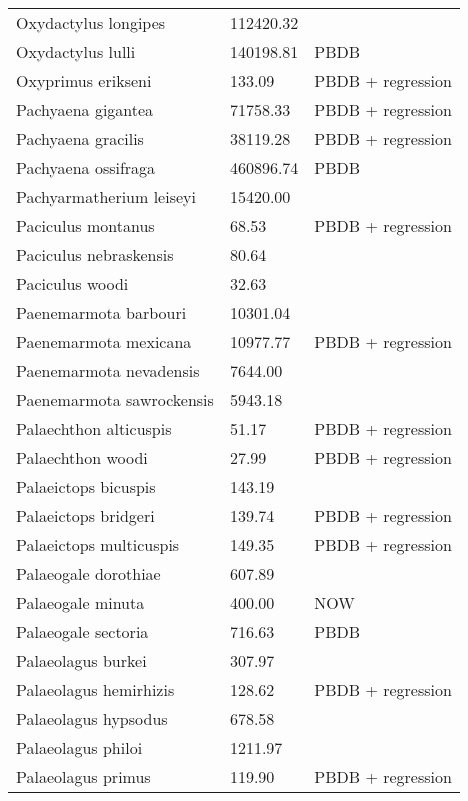 \documentclass{article}
\begin{document}
\begin{center}
\begin{longtable}{p{} p{} p{}}
    Oxydactylus longipes & 112420.32 & \cite{Tomiya2013} \\ 
    Oxydactylus lulli & 140198.81 & PBDB \\ 
    Oxyprimus erikseni & 133.09 & PBDB + regression \\ 
    Pachyaena gigantea & 71758.33 & PBDB + regression \\ 
    Pachyaena gracilis & 38119.28 & PBDB + regression \\ 
    Pachyaena ossifraga & 460896.74 & PBDB \\ 
    Pachyarmatherium leiseyi & 15420.00 & \cite{McDonald2005} \\ 
    Paciculus montanus & 68.53 & PBDB + regression \\ 
    Paciculus nebraskensis & 80.64 & \cite{Tomiya2013} \\ 
    Paciculus woodi & 32.63 & \cite{Korth1993} \\ 
    Paenemarmota barbouri & 10301.04 & \cite{Tomiya2013} \\ 
    Paenemarmota mexicana & 10977.77 & PBDB + regression \\ 
    Paenemarmota nevadensis & 7644.00 & \cite{McKenna2011} \\ 
    Paenemarmota sawrockensis & 5943.18 & \cite{Tomiya2013} \\ 
    Palaechthon alticuspis & 51.17 & PBDB + regression \\ 
    Palaechthon woodi & 27.99 & PBDB + regression \\ 
    Palaeictops bicuspis & 143.19 & \cite{Simons1960} \\ 
    Palaeictops bridgeri & 139.74 & PBDB + regression \\ 
    Palaeictops multicuspis & 149.35 & PBDB + regression \\ 
    Palaeogale dorothiae & 607.89 & \cite{Tomiya2013} \\ 
    Palaeogale minuta & 400.00 & NOW \\ 
    Palaeogale sectoria & 716.63 & PBDB \\ 
    Palaeolagus burkei & 307.97 & \cite{Tomiya2013} \\ 
    Palaeolagus hemirhizis & 128.62 & PBDB + regression \\ 
    Palaeolagus hypsodus & 678.58 & \cite{Tomiya2013} \\ 
    Palaeolagus philoi & 1211.97 & \cite{Tomiya2013} \\ 
    Palaeolagus primus & 119.90 & PBDB + regression \\ 

\end{longtable}
\end{center}
\end{document}
